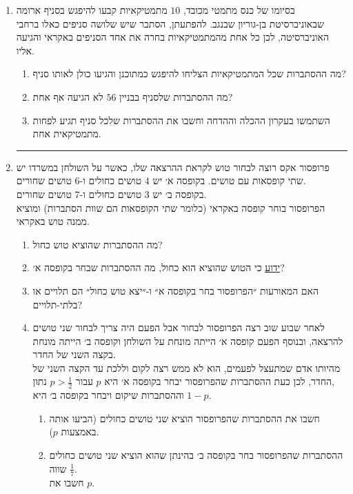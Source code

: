 \documentclass[12pt, a4paper]{article}
\begin{document}
\begin{enumerate}

\item
בסיומו של כנס מתמטי מכובד,
$10$
 מתמטיקאיות קבעו להיפגש בסניף ארומה שבאוניברסיטת בן-גוריון שבנגב. 
 להפתעתן, הסתבר שיש
שלושה סניפים כאלו ברחבי האוניברסיטה,
לכן כל אחת מהמתמטיקאיות  בחרה את אחד הסניפים באקראי והגיעה אליו.
\begin{enumerate}
\item
מה ההסתברות שכל המתמטיקאיות הצליחו להיפגש כמתוכנן והגיעו כולן לאותו סניף?
\item
מה ההסתברות שלסניף בבניין 
$56$
לא הגיעה אף אחת?
\item
השתמשו בעקרון ההכלה וההדחה וחשבו את ההסתברות שלכל סניף תגיע לפחות מתמטיקאית אחת.
\end{enumerate}

\noindent\rule{15cm}{0.4pt}

\item
פרופסור אקס רוצה לבחור טוש לקראת ההרצאה שלו, כאשר על השולחן במשרדו
יש שתי קופסאות עם טושים. בקופסה א׳ יש
$4$
טושים
כחולים
ו-$6$
טושים שחורים.
\\
בקופסה ב׳ יש
$3$
טושים כחולים
ו-$7$
טושים שחורים.
\\
הפרופסור  בוחר קופסה באקראי (כלומר שתי הקופסאות הם שוות הסתברות)  ומוציא ממנה טוש באקראי. 
\begin{enumerate}
\item
מה ההסתברות שהוציא טוש כחול?
\item
\underline{ידוע} כי הטוש שהוציא הוא כחול, מה ההסתברות  שבחר בקופסה א׳?
\item
האם המאורעות ״הפרופסור בחר בקופסה א״ ו-״יצא טוש כחול״ הם תלויים או בלתי-תלויים?
\item
לאחר שבוע שוב רצה הפרופסור לבחור אבל הפעם היה צריך לבחור שני טושים להרצאה, ובנוסף הפעם קופסה א׳ הייתה מונחת על השולחן וקופסה ב׳ הייתה מונחת בקצה השני של החדר.
\\
מהיותו אדם שמתעצל לפעמים, הוא לא ממש רצה לקום וללכת עד הקצה השני של החדר, לכן כעת ההסתברות שהפרופסור יבחר בקופסה א׳ היא 
$p$
עבור
$p>\frac{1}{2}$ נתון,
\\
וההסתברות שיקום ויבחר בקופסה ב׳ היא
$1-p$.

\begin{enumerate}
\item[(1)]
חשבו את ההסתברות  שהפרופסור הוציא שני טושים כחולים (הביעו אותה באמצעות
$p$).
\item[(2)]
ההסתברות שהפרופסור בחר בקופסה ב׳ בהינתן שהוא הוציא שני טושים כחולים שווה
$\frac{1}{7}$.
\\
חשבו את
$p$.
\end{enumerate}


\end{enumerate}
\end{enumerate}
\end{document}
